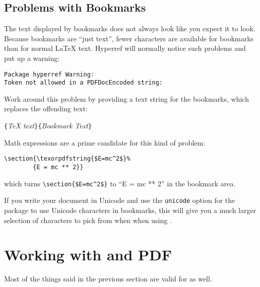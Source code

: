\subsection{Problems with Bookmarks}

The text displayed by bookmarks does not always look like you expect
it to look. Because bookmarks are \enquote{just text}, fewer
characters are available for bookmarks than for normal \LaTeX{} text.
Hyperref will normally notice such problems and put up a warning:
\begin{code}
\begin{verbatim}
Package hyperref Warning:
Token not allowed in a PDFDocEncoded string:
\end{verbatim}
\end{code}
Work around this problem by providing a text string for
the bookmarks, which replaces the offending text:
\begin{lscommand}
\verb|{|\emph{\TeX{} text}\verb|}{|\emph{Bookmark Text}\verb|}|
\end{lscommand}


Math expressions are a prime candidate for this kind of problem:
\begin{code}
\begin{verbatim}
\section{\texorpdfstring{$E=mc^2$}%
        {E = mc ** 2}}
\end{verbatim}
\end{code}
which turns \verb+\section{$E=mc^2$}+ to ``E = mc ** 2'' in the bookmark area.

If you write your document in Unicode and use the \verb+unicode+ option for
the  package to use Unicode characters in bookmarks, this
will give you a much larger selection of characters to pick from when
when using .

\section{Working with  and PDF}%
\label{sec:xetex}

%
Most of the things said in the previous section are valid for  as well.

